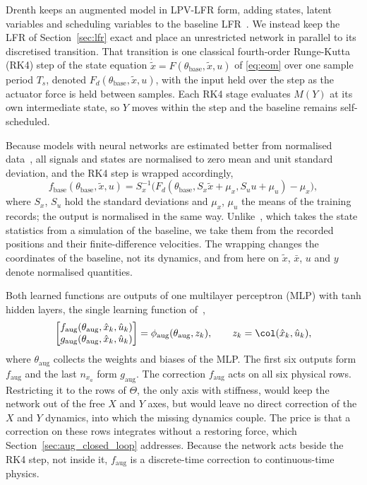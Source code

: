 Drenth keeps an augmented model in LPV-LFR form, adding states, latent
variables and scheduling variables to the baseline
LFR~\cite[Sec.~5.2]{drenth2025thesis}.
We instead keep the LFR of Section~\ref{sec:lfr} exact and place an
unrestricted network in parallel to its discretised transition.
That transition is one classical fourth-order Runge-Kutta (RK4) step of the
state equation $\dot{\tilde x}=F(\theta_{\mathrm{base}},\tilde x,u)$ of
\eqref{eq:eom} over one sample period $T_s$, denoted
$F_d(\theta_{\mathrm{base}},\tilde x,u)$, with the input held over the step
as the actuator force is held between samples.
Each RK4 stage evaluates $M(Y)$ at its own intermediate state, so $Y$ moves
within the step and the baseline remains self-scheduled.

Because models with neural networks are estimated better from normalised
data~\cite[Sec.~5.3]{hoekstra2026lfr}, all signals and states are
normalised to zero mean and unit standard deviation, and the RK4 step is
wrapped accordingly,
\begin{equation}
 f_{\mathrm{base}}(\theta_{\mathrm{base}},\tilde x,u)
 =S_x^{-1}\bigl(F_d(\theta_{\mathrm{base}},S_x\tilde x+\mu_x,
   S_u u+\mu_u)-\mu_x\bigr),
 \label{eq:aug_fbase}
\end{equation}
where $S_x$, $S_u$ hold the standard deviations and $\mu_x$, $\mu_u$ the
means of the training records; the output is normalised in the same way.
Unlike~\cite[Sec.~5.3]{hoekstra2026lfr}, which takes the state statistics
from a simulation of the baseline, we take them from the recorded positions
and their finite-difference velocities.
The wrapping changes the coordinates of the baseline, not its dynamics, and
from here on $\tilde x$, $\bar x$, $u$ and $y$ denote normalised quantities.

Both learned functions are outputs of one multilayer perceptron (MLP) with
tanh hidden layers, the single learning function
of~\cite[Eq.~(22d)]{hoekstra2026lfr},
\begin{equation}
 \begin{bmatrix}
  f_{\mathrm{aug}}(\theta_{\mathrm{aug}},\hat x_k,\hat u_k)\\
  g_{\mathrm{aug}}(\theta_{\mathrm{aug}},\hat x_k,\hat u_k)
 \end{bmatrix}
 =\phi_{\mathrm{aug}}(\theta_{\mathrm{aug}},z_k),\qquad
 z_k=\col(\hat x_k,\hat u_k),
 \label{eq:aug_mlp}
\end{equation}
where $\theta_{\mathrm{aug}}$ collects the weights and biases of the MLP.
The first six outputs form $f_{\mathrm{aug}}$ and the last $n_{x_a}$ form
$g_{\mathrm{aug}}$.
The correction $f_{\mathrm{aug}}$ acts on all six physical rows.
Restricting it to the rows of $\Theta$, the only axis with stiffness, would
keep the network out of the free $X$ and $Y$ axes, but would leave no direct
correction of the $X$ and $Y$ dynamics, into which the missing dynamics
couple.
The price is that a correction on these rows integrates without a restoring
force, which Section~\ref{sec:aug_closed_loop} addresses.
Because the network acts beside the RK4 step, not inside it,
$f_{\mathrm{aug}}$ is a discrete-time correction to continuous-time physics.

